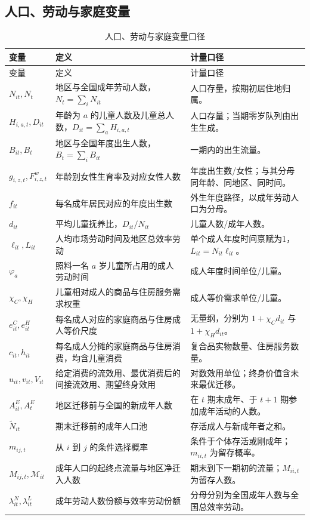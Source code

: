 \documentclass[UTF8,a4paper,zihao=-4,fontset=windows]{ctexart}
\numberwithin{equation}{section}
\begin{document}
\subsection{人口、劳动与家庭变量}
\small
\begin{longtable}{L{0.23\textwidth}L{0.43\textwidth}L{0.24\textwidth}}
\caption{人口、劳动与家庭变量口径}\label{tab:notation-households}\\
\toprule
变量 & 定义 & 计量口径\\
\midrule
\endfirsthead
\toprule
变量 & 定义 & 计量口径\\
\midrule
\endhead
\bottomrule
\endfoot
$N_{it},N_t$ & 地区与全国成年劳动人数，$N_t=\sum_iN_{it}$ & 人口存量，按期初居住地归属。\\
$H_{i,a,t},D_{it}$ & 年龄为 $a$ 的儿童人数及儿童总人数，$D_{it}=\sum_aH_{i,a,t}$ & 人口存量；当期零岁队列由出生生成。\\
$B_{it},B_t$ & 地区与全国年度出生人数，$B_t=\sum_iB_{it}$ & 一期内的出生流量。\\
$g_{i,z,t},F^w_{i,z,t}$ & 年龄别女性生育率及对应女性人数 & 年度出生数/女性；与其分母同年龄、同地区、同时间。\\
$f_{it}$ & 每名成年居民对应的年度出生数 & 外生年度路径，以成年劳动人口为分母。\\
$d_{it}$ & 平均儿童抚养比，$D_{it}/N_{it}$ & 儿童人数/成年人数。\\
$\ell_{it},L_{it}$ & 人均市场劳动时间及地区总效率劳动 & 单个成人年度时间禀赋为1，$L_{it}=N_{it}\ell_{it}$。\\
$\varphi_a$ & 照料一名 $a$ 岁儿童所占用的成人劳动时间 & 成人年度时间单位/儿童。\\
$\chi_C,\chi_H$ & 儿童相对成人的商品与住房服务需求权重 & 成人等价需求单位/儿童。\\
$e^C_{it},e^H_{it}$ & 每名成人对应的家庭商品与住房成人等价尺度 & 无量纲，分别为 $1+\chi_Cd_{it}$ 与 $1+\chi_Hd_{it}$。\\
$c_{it},h_{it}$ & 每名成人分摊的家庭商品与住房消费，均含儿童消费 & 复合品实物数量、住房服务数量。\\
$u_{it},v_{it},V_{it}$ & 给定消费的流效用、最优消费后的间接流效用、期望终身效用 & 对数效用单位；终身价值含未来最优迁移。\\
$A^E_{it},A^E_t$ & 地区迁移前与全国的新成年人数 & 在 $t$ 期末成年、于 $t+1$ 期参加成年活动的人数。\\
$\widetilde N_{it}$ & 期末迁移前的成年人口池 & 存活成人与新成年者之和。\\
$m_{ij,t}$ & 从 $i$ 到 $j$ 的条件选择概率 & 条件于个体存活或刚成年；$m_{ii,t}$ 为留存概率。\\
$M_{ij,t},\mathcal M_{it}$ & 成年人口的起终点流量与地区净迁入人数 & 期末到下一期初的流量；$M_{ii,t}$ 为留存人数。\\
$\lambda^N_{it},\lambda^L_{it}$ & 成年劳动人数份额与效率劳动份额 & 分母分别为全国成年人数与全国总效率劳动。\\
\end{longtable}
\normalsize
\end{document}
